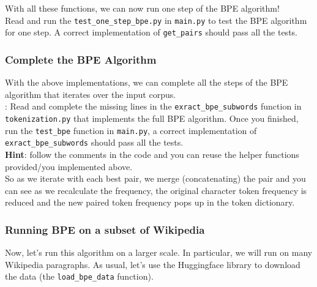 \noindent With all these functions, we can now run one step of the BPE algorithm! \\

\noindent Read and run the \texttt{test\_one\_step\_bpe.py} in \texttt{main.py} to test the BPE algorithm for one step. A correct implementation of \texttt{get\_pairs} should pass all the tests.

\subsubsection{Complete the BPE Algorithm}
With the above implementations, we can complete all the steps of the BPE algorithm that iterates over the input corpus.\\

\noindent \todo{}: Read and complete the missing lines in the \texttt{exract\_bpe\_subwords} function in \texttt{tokenization.py} that implements the full BPE algorithm. Once you finished, run the \texttt{test\_bpe} function in \texttt{main.py}, a correct implementation of \texttt{exract\_bpe\_subwords} should pass all the tests.\\
\noindent \textbf{Hint}: follow the comments in the code and you can reuse the helper functions provided/you implemented above.\\

So as we iterate with each best pair, we merge (concatenating) the pair and you can see as we recalculate the frequency, the original character token frequency is reduced and the new paired token frequency pops up in the token dictionary.

\subsubsection{Running BPE on a subset of Wikipedia}
Now, let's run this algorithm on a larger scale. In particular, we will run on many Wikipedia paragraphs. As usual, let's use the Huggingface library to download the data (the \texttt{load\_bpe\_data} function).\\

